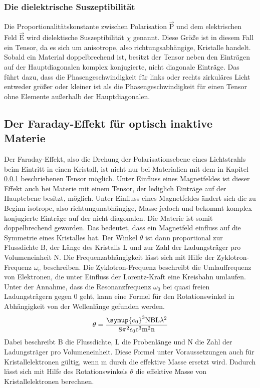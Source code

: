 \subsubsection{Die dielektrische Suszeptibilität}
\label{sssec:sus}
Die Proportionalitätskonstante zwischen Polarisation $\vec{\text{P}}$ und dem
elektrischen Feld $\vec{\text{E}}$ wird dielektische Suszeptibilität $\chi$
genannt. Diese Größe ist in diesem Fall ein Tensor, da es sich um anisotrope,
also richtungsabhängige, Kristalle handelt. Sobald ein Material doppelbrechend
ist, besitzt der Tensor neben den Einträgen auf der Hauptdiagonalen
komplex konjugierte, nicht diagonale Einträge. Das führt dazu, dass die
Phasengeschwindigkeit für links oder rechts zirkuläres Licht entweder größer
oder kleiner ist als die Phasengeschwindigkeit für einen Tensor ohne Elemente
außerhalb der Hauptdiagonalen.

\subsection{Der Faraday-Effekt für optisch inaktive Materie}
Der Faraday-Effekt, also die Drehung der Polarisationsebene eines Lichtstrahls
beim Eintritt in einen Kristall, ist nicht nur bei Materialien mit dem in
Kapitel \ref{sssec:sus} beschriebenen Tensor möglich. Unter Einfluss eines
Magnetfeldes ist dieser Effekt auch bei Materie mit einem Tensor, der
lediglich Einträge auf der Hauptebene besitzt, möglich. Unter Einfluss eines
Magnetfeldes ändert sich die zu Beginn isotrope, also richtungunabhängige, Masse
jedoch und bekommt komplex konjugierte Einträge auf der nicht diagonalen. Die
Materie ist somit doppelbrechend geworden. Das bedeutet, dass ein Magnetfeld
einfluss auf die Symmetrie eines Kristalles hat. Der Winkel $\theta$ ist dann
proportional zur Flussdichte $\text{B}$, der Länge des Kristalls $\text{L}$ und
zur Zahl der Ladungsträger pro Volumeneinheit $\text{N}$. Die
Frequenzabhängigkeit lässt sich mit Hilfe der Zyklotron-Frequenz
$\omega_{\text{c}}$
beschreiben. Die Zyklotron-Frequenz beschreibt die Umlauffrequenz von Elektronen,
die unter Einfluss der Lorentz-Kraft eine Kreisbahn umlaufen. Unter der Annahme,
dass die Resonanzfrequenz $\omega_0$ bei quasi freien Ladungsträgern gegen
0 geht, kann eine Formel für den Rotationswinkel in Abhängigkeit von der
Wellenlänge gefunden werden.
\begin{equation}
  \theta = \frac{\symup{e_0}^3 \text{N} \text{B} \text{L} \lambda^2}
  {8 \pi^2 \epsilon_0 \text{c}^3 \text{m}^2 \text{n}}
  \label{eqn:ekelgleichung}
\end{equation}
Dabei beschreibt B die Flussdichte, L die Probenlänge und N die Zahl der
Ladungsträger pro Volumeneinheit. Diese Formel unter Voraussetzungen auch
für Kristallelektronen gültig, wenn m durch die effektive Masse ersetzt wird.
Dadurch lässt sich mit Hilfe des Rotationswinkels $\theta$ die effektive
Masse von Kristallelektronen berechnen.
